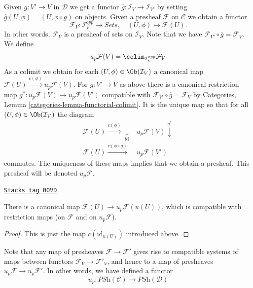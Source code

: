 Given $g : V' \to V$ in $\mathcal{D}$ we get a functor
$\overline{g} : \mathcal{I}_V \to \mathcal{I}_{V'}$
by setting $\overline{g}(U, \phi) = (U, \phi \circ g)$
on objects. Given a presheaf $\mathcal{F}$ on $\mathcal{C}$
we obtain a functor
$$
\mathcal{F}_V :
\mathcal{I}_V^{opp}
\longrightarrow
\textit{Sets}, \quad
(U, \phi)
\longmapsto
\mathcal{F}(U).
$$
In other words, $\mathcal{F}_V$ is a presheaf of sets on $\mathcal{I}_V$.
Note that we have $\mathcal{F}_{V'} \circ \overline{g} = \mathcal{F}_V$.
We define
$$
u_p\mathcal{F}(V) =
\colim_{\mathcal{I}_V^{opp}} \mathcal{F}_V
$$
As a colimit we obtain for each $(U, \phi) \in \Ob(\mathcal{I}_V)$
a canonical map $\mathcal{F}(U)\xrightarrow{c(\phi)}u_p\mathcal{F}(V)$.
For $g : V' \to V$ as above there is a
canonical restriction map
$g^* : u_p\mathcal{F}(V) \to u_p\mathcal{F}(V')$
compatible with
$\mathcal{F}_{V'} \circ \overline{g} = \mathcal{F}_V$
by Categories, Lemma \ref{categories-lemma-functorial-colimit}.
It is the unique map so that for all $(U, \phi) \in \Ob(\mathcal{I}_V)$
the diagram
$$
\begin{array}{cc}\mathcal{F}(U) \overset{c(\phi)}{\longrightarrow}\underset{\text{id}}{\downarrow} & u_p\mathcal{F}(V) \overset{g^*}{\downarrow} \\ \mathcal{F}(U) \overset{c(\phi \circ g)}{\longrightarrow} & u_p\mathcal{F}(V')\end{array}
$$
commutes. The uniqueness of these maps implies that we obtain a
presheaf. This presheaf will be denoted $u_p\mathcal{F}$.

\begin{lemma}[Recover]
\label{sites-lemma-recover}
\href{https://stacks.math.columbia.edu/tag/00VD}{\texttt{Stacks tag 00VD}}

There is a canonical map
$\mathcal{F}(U) \to u_p\mathcal{F}(u(U))$,
which is compatible with restriction maps
(on $\mathcal{F}$ and on $u_p\mathcal{F}$).
\end{lemma}

\begin{proof}
This is just the map $c(\text{id}_{u(U)})$ introduced above.
\end{proof}

Note that any map of presheaves $\mathcal{F} \to \mathcal{F}'$
gives rise to compatible systems of maps between functors
$\mathcal{F}_V \to \mathcal{F}'_V$, and hence to a map
of presheaves $u_p\mathcal{F} \to u_p\mathcal{F}'$. In other
words, we have defined a functor
$$
u_p :
\textit{PSh}(\mathcal{C})
\longrightarrow
\textit{PSh}(\mathcal{D})
$$

